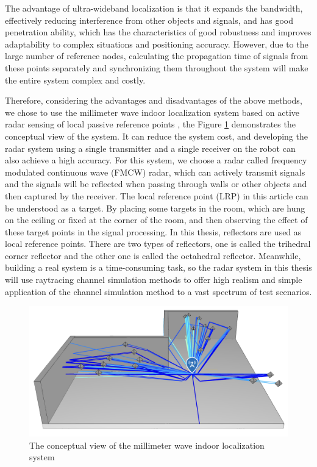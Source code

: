 \documentclass[12pt,DIV14,BCOR12mm,a4paper,footinclude=false,headinclude,parskip=half-,twoside,openright,cleardoublepage=empty,toc=index,bibliography=totoc,listof=totoc]{scrreprt}
\numberwithin{equation}{chapter}
\begin{document}
The advantage of ultra-wideband localization \cite{UWB} is that it expands the bandwidth, effectively reducing interference from other objects and signals, and has good penetration ability, which has the characteristics of good robustness and improves adaptability to complex situations and positioning accuracy. However, due to the large number of reference nodes, calculating the propagation time of signals from these points separately and synchronizing them throughout the system will make the entire system complex and costly.

Therefore, considering the advantages and disadvantages of the above methods, we chose to use the millimeter wave indoor localization system based on active radar sensing of local passive reference points \cite{schlachter_indoor_2024}, the Figure \ref{conceptual view} demonstrates the conceptual view of the system. It can reduce the system cost, and developing the radar system using a single transmitter and a single receiver on the robot can also achieve a high accuracy. For this system, we choose a radar called frequency modulated continuous wave (FMCW) radar, which can actively transmit signals and the signals will be reflected when passing through walls or other objects and then captured by the receiver. The local reference point (LRP) in this article can be understood as a target. By placing some targets in the room, which are hung on the ceiling or fixed at the corner of the room, and then observing the effect of these target points in the signal processing. In this thesis, reflectors are used as local reference points. There are two types of reflectors, one is called the trihedral corner reflector and the other one is called the octahedral reflector. Meanwhile, building a real system is a time-consuming task, so the radar system in this thesis will use raytracing channel simulation methods to offer high realism and simple application of the channel simulation method to a vast spectrum of test scenarios.

\begin{figure}
	\centering
	\includegraphics[scale=.4]{figures/thesis_plot.png}
	\caption{The conceptual view of the millimeter wave indoor localization system}
	\label{conceptual view}
\end{figure}
\end{document}
